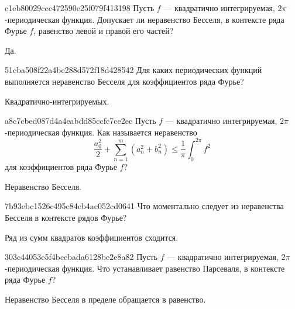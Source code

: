 \begin{note}{c1eb80029ccc472590e25f079f413198}
    Пусть \({ f }\) --- квадратично интегрируемая, \({ 2\pi }\)-периодическая функция.
    Допускает ли неравенство Бесселя, в контексте ряда Фурье \({ f }\), равенство левой и правой его частей?

    \begin{cloze}{1}
        Да.
    \end{cloze}
\end{note}

\begin{note}{51cba508f22a4be288d572f18d428542}
    Для каких периодических функций выполняется неравенство Бесселя для коэффициентов ряда Фурье?

    \begin{cloze}{1}
        Квадратично-интегрируемых.
    \end{cloze}
\end{note}

\begin{note}{a8c7cbed087d4a4eabdd85ccfc7ce2ec}
    Пусть \({ f }\) --- квадратично интегрируемая, \({ 2\pi }\)-периодическая функция.
    Как называется неравенство
    \[
        \frac{a_0^2}{2} + \sum_{n=1}^{m}  (a_n^2 + b_n^2) \leqslant \frac{1}{\pi} \int_{0}^{2\pi} f^2
    \]
    для коэффициентов ряда Фурье \({ f }\)?

    \begin{cloze}{1}
        Неравенство Бесселя.
    \end{cloze}
\end{note}

\begin{note}{7b93ebc1526c495c84cb4ac052cd0641}
    Что моментально следует из неравенства Бесселя в контексте рядов Фурье?

    \begin{cloze}{1}
        Ряд из сумм квадратов коэффициентов сходится.
    \end{cloze}
\end{note}

\begin{note}{303c44053e5f4bcebada6128be2e8a82}
    Пусть \({ f }\) --- квадратично интегрируемая, \({ 2\pi }\)-периодическая функция.
    Что устанавливает равенство Парсеваля, в контексте ряда Фурье \({ f }\)?

    \begin{cloze}{1}
        Неравенство Бесселя в пределе обращается в равенство.
    \end{cloze}
\end{note}

